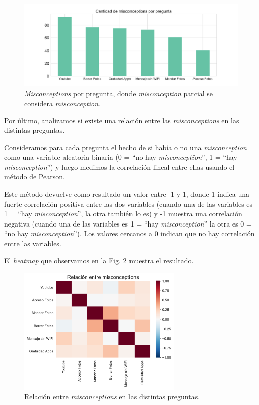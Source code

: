 \begin{figure}[h]
    \centering
    \includegraphics[width=1\textwidth]{images_analisis/27.pdf} 
    \caption{\textit{Misconceptions} por pregunta, donde \textit{misconception} parcial se considera \textit{misconception}.}
    \label{fig:analisis27}
\end{figure}

Por último, analizamos si existe una relación entre las \textit{misconceptions} en las distintas preguntas.

Consideramos para cada pregunta el hecho de si había o no una \textit{misconception} como una variable aleatoria binaria (0 = “no hay \textit{misconception}”, 1 = “hay \textit{misconception}”) y luego medimos la correlación lineal entre ellas usando el método de Pearson. 

Este método devuelve como resultado un valor entre -1 y 1, donde 1 indica una fuerte correlación positiva entre las dos variables (cuando una de las variables es 1 = “hay \textit{misconception}”, la otra también lo es) y -1 muestra una correlación negativa (cuando una de las variables es 1 = “hay \textit{misconception}” la otra es 0 = “no hay \textit{misconception}”). Los valores cercanos a 0 indican que no hay correlación entre las variables.

El \textit{heatmap} que observamos en la Fig. \ref{fig:analisis28} muestra el resultado. 

\begin{figure}[h]
    \centering
    \includegraphics[width=0.7\textwidth]{images_analisis/28.pdf}
    \caption{Relación entre \textit{misconceptions} en las distintas preguntas. }
    \label{fig:analisis28}
\end{figure}

